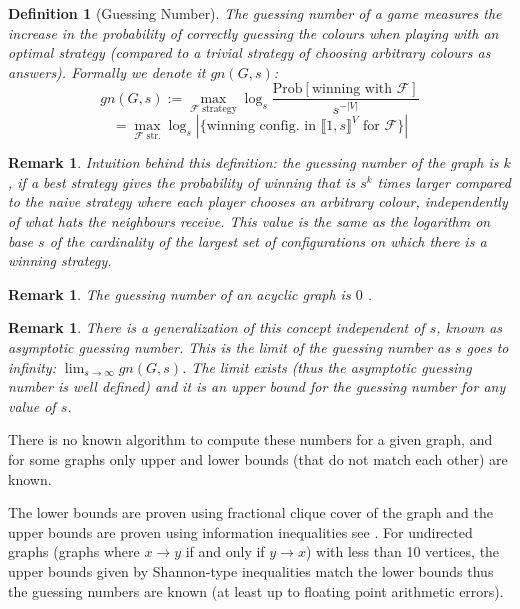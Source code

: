 \documentclass[11pt, a4paper]{kybernetika}
\newtheorem{remark}[theorem]{Remark}
\newtheorem{definition}[theorem]{Definition}
\newcommand{\prob}{\mathrm{Prob}}
\begin{document}
	\begin{definition}[Guessing Number]\label{defin:gn}
		The \emph{guessing number} of a game  measures the increase in the probability of correctly guessing the colours when playing with an optimal strategy (compared to a trivial strategy of choosing arbitrary colours as answers). Formally we denote it $gn(G,s)$:
		$$
		gn(G,s):=\max_{\mathcal{F}\text{ strategy}}\log_s\frac{\prob[\text{winning with }\mathcal{F}]}{s^{-|V|}}$$
		$$=\max_{\mathcal{F}\text{ str.}}\log_s\left|\{\text{winning config. in }\llbracket1,s\rrbracket^V\text{ for }\mathcal{F}\}\right|
		$$
	\end{definition}
	\begin{remark}
		Intuition behind this definition: the guessing number of the graph is $k$, if a best strategy gives the probability of winning that is $s^k$ times larger compared to the naive strategy where each player chooses an arbitrary colour, independently of what hats the neighbours receive. This value is the same as the logarithm on base $s$ of the cardinality of the largest set of configurations on which there is a winning strategy.
	\end{remark}
	\begin{remark}\label{rem:acyclicity}
		The guessing number of an acyclic graph is $0$ \cite[Lemma~3]{riis2006utilising}.
	\end{remark}
	\begin{remark}
		There is a generalization of this concept independent of $s$, known as \emph{asymptotic guessing number}. This is the limit of the guessing number as $s$ goes to infinity: $\lim_{s\to\infty}gn(G,s)$. The limit exists (thus the asymptotic guessing number is well defined) and it is an upper bound for the guessing number for any value of $s$.
	\end{remark}
	There is no known algorithm to compute these numbers for a given graph, and for some graphs only upper and lower bounds (that do not match each other) are known. 
	
	The lower bounds are proven using fractional clique cover of the graph and the upper bounds are proven using information inequalities see \cite{christofides2011guessing, baber2016graph}. For undirected graphs (graphs where $x\rightarrow y$ if and only if $y\rightarrow x$) with less than 10 vertices, the upper bounds given by Shannon-type inequalities match the lower bounds \cite{baber2016graph} thus the guessing numbers are known (at least up to floating point arithmetic errors).
	
\end{document}
